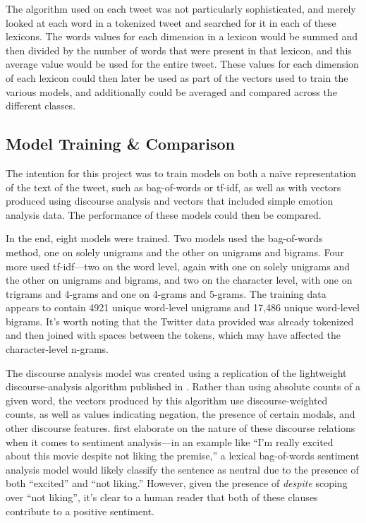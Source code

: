 \documentclass[article,oneside,a4paper,12pt]{memoir}
\begin{document}
The algorithm used on each tweet was not particularly sophisticated, and merely looked at each word in a tokenized tweet and searched for it in each of these lexicons. The words values for each dimension in a lexicon would be summed and then divided by the number of words that were present in that lexicon, and this average value would be used for the entire tweet. These values for each dimension of each lexicon could then later be used as part of the vectors used to train the various models, and additionally could be averaged and compared across the different classes.

\subsection{Model Training \& Comparison}

The intention for this project was to train models on both a naïve representation of the text of the tweet, such as bag-of-words or tf-idf, as well as with vectors produced using discourse analysis and vectors that included simple emotion analysis data. The performance of these models could then be compared. 

In the end, eight models were trained. Two models used the bag-of-words method, one on solely unigrams and the other on unigrams and bigrams. Four more used tf-idf---two on the word level, again with one on solely unigrams and the other on unigrams and bigrams, and two on the character level, with one on trigrams and 4-grams and one on 4-grams and 5-grams. The training data appears to contain 4921 unique word-level unigrams and 17,486 unique word-level bigrams. It's worth noting that the Twitter data provided was already tokenized and then joined with spaces between the tokens, which may have affected the character-level n-grams.

The discourse analysis model was created using a replication of the lightweight discourse-analysis algorithm published in \textcite{coling2012}. Rather than using absolute counts of a given word, the vectors produced by this algorithm use discourse-weighted counts, as well as values indicating negation, the presence of certain modals, and other discourse features. \citeauthor{coling2012} first elaborate on the nature of these discourse relations when it comes to sentiment analysis---in an example like ``I'm really excited about this movie despite not liking the premise,'' a lexical bag-of-words sentiment analysis model would likely classify the sentence as neutral due to the presence of both ``excited'' and ``not liking.'' However, given the presence of \emph{despite} scoping over ``not liking'', it's clear to a human reader that both of these clauses contribute to a positive sentiment. 
\end{document}
